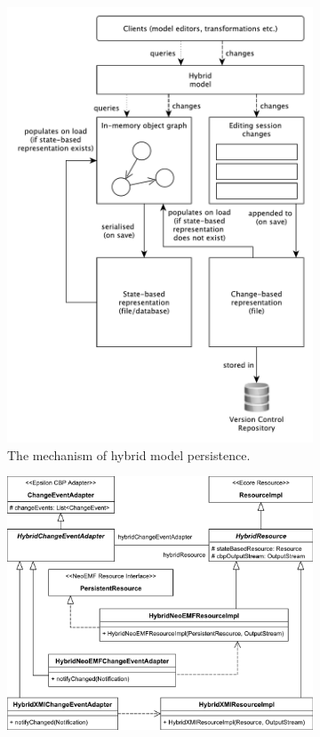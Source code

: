 \documentclass{llncs}
\begin{document}
\begin{figure}[ht]
    \begin{subfigure}{0.49\linewidth}
        \includegraphics[width=\linewidth]{images/hybrid_persistence}
        \caption{The mechanism of hybrid model persistence.}
        \label{fig:hybrid_persistence}
    \end{subfigure}
    \begin{subfigure}{0.49\linewidth}
        \includegraphics[width=\linewidth]{images/class_diagram}

\end{subfigure}
\end{figure}
\end{document}
